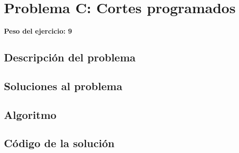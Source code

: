 \newpage{}
\section{Problema C: Cortes programados}
\textbf{Peso del ejercicio: 9}
\subsection{Descripción del problema}
\subsection{Soluciones al problema}
\subsection{Algoritmo}
\newpage
\subsection{Código de la solución}

